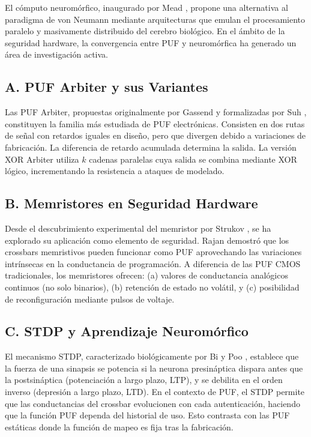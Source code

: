 El cómputo neuromórfico, inaugurado por Mead \cite{mead1990neuromorphic}, propone una alternativa al paradigma de von Neumann mediante arquitecturas que emulan el procesamiento paralelo y masivamente distribuido del cerebro biológico. En el ámbito de la seguridad hardware, la convergencia entre PUF y neuromórfica ha generado un área de investigación activa.

\subsection*{A. PUF Arbiter y sus Variantes}

Las PUF Arbiter, propuestas originalmente por Gassend \cite{gassend2002puf} y formalizadas por Suh \cite{suh2007puf}, constituyen la familia más estudiada de PUF electrónicas. Consisten en dos rutas de señal con retardos iguales en diseño, pero que divergen debido a variaciones de fabricación. La diferencia de retardo acumulada determina la salida. La versión XOR Arbiter utiliza $k$ cadenas paralelas cuya salida se combina mediante XOR lógico, incrementando la resistencia a ataques de modelado.

\subsection*{B. Memristores en Seguridad Hardware}

Desde el descubrimiento experimental del memristor por Strukov \cite{strukov2008memristor}, se ha explorado su aplicación como elemento de seguridad. Rajan \cite{rajan2020memristor} demostró que los crossbars memristivos pueden funcionar como PUF aprovechando las variaciones intrínsecas en la conductancia de programación. A diferencia de las PUF CMOS tradicionales, los memristores ofrecen: (a) valores de conductancia analógicos continuos (no solo binarios), (b) retención de estado no volátil, y (c) posibilidad de reconfiguración mediante pulsos de voltaje.

\subsection*{C. STDP y Aprendizaje Neuromórfico}

El mecanismo STDP, caracterizado biológicamente por Bi y Poo \cite{bi1998stdp}, establece que la fuerza de una sinapsis se potencia si la neurona presináptica dispara antes que la postsináptica (potenciación a largo plazo, LTP), y se debilita en el orden inverso (depresión a largo plazo, LTD). En el contexto de PUF, el STDP permite que las conductancias del crossbar evolucionen con cada autenticación, haciendo que la función PUF dependa del historial de uso. Esto contrasta con las PUF estáticas donde la función de mapeo es fija tras la fabricación.

